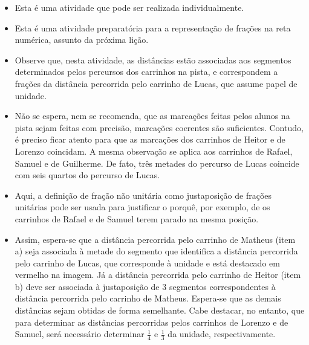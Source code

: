 \documentclass[10 pt,usenames,dvipsnames, oneside]{article}
\begin{document}
\begin{goals}
  \begin{itemize} %
    \item       Esta é uma atividade que pode ser realizada individualmente.
    \item       Esta é uma atividade preparatória para a representação de frações na reta numérica, assunto da próxima lição.
    \item       Observe que, nesta atividade, as distâncias estão associadas aos segmentos determinados pelos percursos dos carrinhos na pista, e correspondem a frações da distância percorrida pelo carrinho de Lucas, que assume papel de unidade.
    \item       Não se espera, nem se recomenda, que as marcações feitas pelos alunos na pista sejam feitas com precisão, marcações coerentes são suficientes. Contudo, é preciso ficar atento para que as marcações dos carrinhos de Heitor e de Lorenzo coincidam. A mesma observação se aplica aos carrinhos de Rafael, Samuel e de Guilherme. De fato, três metades do percurso de Lucas coincide com seis quartos do percurso de Lucas.
    \item       Aqui, a definição de fração não unitária como justaposição de frações unitárias pode ser usada para justificar o porquê, por exemplo, de os carrinhos de Rafael e de Samuel terem parado na mesma posição.
    \item       Assim, espera-se que a distância percorrida pelo carrinho de Matheus (item a) seja associada à metade do segmento que identifica a distância percorrida pelo carrinho de Lucas, que corresponde à unidade e está destacado em vermelho na imagem. Já a distância percorrida pelo carrinho de Heitor (item b) deve ser associada à justaposição de       $3$ segmentos correspondentes à distância percorrida pelo carrinho de Matheus. Espera-se que as demais distâncias sejam obtidas de forma semelhante. Cabe destacar, no entanto, que para determinar as distâncias percorridas pelos carrinhos de Lorenzo e de Samuel, será necessário determinar       $\frac{1}{4}$ e       $\frac{1}{3}$ da unidade, respectivamente.
\end{itemize} %


\end{goals}
\end{document}
